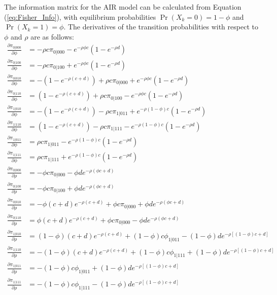 \documentclass[man, noextraspace, floatsintext]{apa6}\usepackage[]{graphicx}\usepackage[]{color}
\begin{document}
The information matrix for the AIR model can be calculated from Equation (\ref{eq:Fisher_Info}), with equilibrium probabilities $\Pr(X_k = 0) = 1 - \phi$ and $\Pr(X_k = 1) = \phi$.
The derivatives of the transition probabilities with respect to $\phi$ and $\rho$ are as follows:
\begin{align*}
\frac{\partial \pi_{0|000}}{\partial \phi} &= -\rho c \pi_{0|000} - e^{-\rho \phi c} \left(1 - e^{-\rho d}\right)  \\
\frac{\partial \pi_{0|100}}{\partial \phi} &= -\rho c \pi_{0|100} + e^{-\rho \phi c} \left(1 - e^{-\rho d}\right) \\
\frac{\partial \pi_{0|010}}{\partial \phi} &= - \left(1 - e^{-\rho(c + d)}\right) + \rho c \pi_{0|000} + e^{-\rho \phi c} \left(1 - e^{-\rho d}\right) \\
\frac{\partial \pi_{0|110}}{\partial \phi} &= \left(1 - e^{-\rho(c + d)}\right) + \rho c \pi_{0|100} - e^{-\rho \phi c} \left(1 - e^{-\rho d}\right) \\
\frac{\partial \pi_{1|010}}{\partial \phi} &= - \left(1 - e^{-\rho(c + d)}\right) - \rho c \pi_{1|011} + e^{-\rho (1 - \phi) c} \left(1 - e^{-\rho d}\right) \\
\frac{\partial \pi_{1|110}}{\partial \phi} &= \left(1 - e^{-\rho(c + d)}\right) - \rho c \pi_{1|111} - e^{-\rho (1 - \phi) c} \left(1 - e^{-\rho d}\right) \\
\frac{\partial \pi_{1|011}}{\partial \phi} &= \rho c \pi_{1|011} - e^{-\rho (1 - \phi) c} \left(1 - e^{-\rho d}\right) \\
\frac{\partial \pi_{1|111}}{\partial \phi} &= \rho c \pi_{1|111} + e^{-\rho (1 - \phi) c} \left(1 - e^{-\rho d}\right) \\
\frac{\partial \pi_{0|000}}{\partial \rho} &= -\phi c \pi_{0|000} - \phi d e^{-\rho(\phi c + d)} \\
\frac{\partial \pi_{0|100}}{\partial \rho} &= -\phi c \pi_{0|100} + \phi d e^{-\rho(\phi c + d)} \\
\frac{\partial \pi_{0|010}}{\partial \rho} &= -\phi(c + d)e^{-\rho(c + d)} + \phi c \pi_{0|000} + \phi d e^{-\rho(\phi c + d)} \\
\frac{\partial \pi_{0|110}}{\partial \rho} &= \phi(c + d)e^{-\rho(c + d)} + \phi c \pi_{0|000} - \phi d e^{-\rho(\phi c + d)} \\
\frac{\partial \pi_{1|010}}{\partial \rho} &= (1 - \phi)(c + d) e^{-\rho(c + d)} + (1 - \phi) c \phi_{1|011} - (1 - \phi)d e^{-\rho[(1 - \phi)c + d]} \\
\frac{\partial \pi_{1|110}}{\partial \rho} &= -(1 - \phi)(c + d) e^{-\rho(c + d)} + (1 - \phi) c \phi_{1|111} + (1 - \phi)d e^{-\rho[(1 - \phi)c + d]} \\
\frac{\partial \pi_{1|011}}{\partial \rho} &= -(1 - \phi) c \phi_{1|011} + (1 - \phi)d e^{-\rho[(1 - \phi)c + d]} \\
\frac{\partial \pi_{1|111}}{\partial \rho} &= -(1 - \phi) c \phi_{1|111} - (1 - \phi)d e^{-\rho[(1 - \phi)c + d]}
\end{align*}
\end{document}
